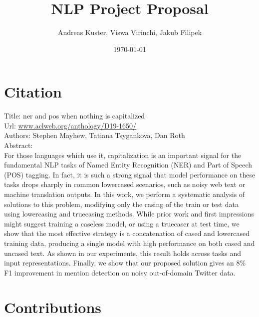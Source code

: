 \documentclass{article}
\title{NLP Project Proposal}
\author{Andreas Kuster, Viswa Virinchi, Jakub Filipek}
\date{\today}
\begin{document}
\maketitle

\section*{Citation}

Title: ner and pos when nothing is capitalized \\

\noindent
Url: \href{https://www.aclweb.org/anthology/D19-1650/}{www.aclweb.org/anthology/D19-1650/} \\

\noindent
Authors: Stephen Mayhew, Tatiana Tsygankova, Dan Roth \\

\noindent
Abstract:  \\
For those languages which use it, capitalization is an important signal for the fundamental NLP tasks of Named Entity Recognition (NER) and Part of Speech (POS) tagging. In fact, it is such a strong signal that model performance on these tasks drops sharply in common lowercased scenarios, such as noisy web text or machine translation outputs. In this work, we perform a systematic analysis of solutions to this problem, modifying only the casing of the train or test data using lowercasing and truecasing methods. While prior work and first impressions might suggest training a caseless model, or using a truecaser at test time, we show that the most effective strategy is a concatenation of cased and lowercased training data, producing a single model with high performance on both cased and uncased text. As shown in our experiments, this result holds across tasks and input representations. Finally, we show that our proposed solution gives an 8\% F1 improvement in mention detection on noisy out-of-domain Twitter data.


\section{Contributions}
\end{document}
